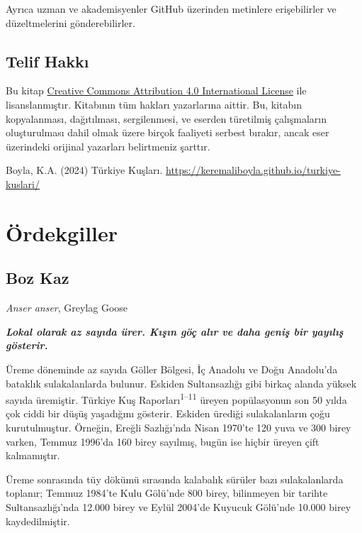 \documentclass[
  letterpaper,
  DIV=11,
  numbers=noendperiod]{scrreprt}
\begin{document}
Ayrıca uzman ve akademisyenler GitHub üzerinden metinlere erişebilirler
ve düzeltmelerini gönderebilirler.

\section*{Telif Hakkı}\label{telif-hakkux131}


Bu kitap \href{https://creativecommons.org/licenses/by/4.0/}{Creative
Commons Attribution 4.0 International License} ile lisanslanmıştır.
Kitabının tüm hakları yazarlarına aittir. Bu, kitabın kopyalanması,
dağıtılması, sergilenmesi, ve eserden türetilmiş çalışmaların
oluşturulması dahil olmak üzere birçok faaliyeti serbest bırakır, ancak
eser üzerindeki orijinal yazarları belirtmeniz şarttır.

Boyla, K.A. (2024) Türkiye Kuşları.
\url{https://keremaliboyla.github.io/turkiye-kuslari/}


\chapter{Ördekgiller}\label{uxf6rdekgiller}

\section{Boz Kaz}\label{boz-kaz}

\emph{Anser anser}, Greylag Goose

\textbf{\emph{Lokal olarak az sayıda ürer. Kışın göç alır ve daha geniş
bir yayılış gösterir.}}

Üreme döneminde az sayıda Göller Bölgesi, İç Anadolu ve Doğu Anadolu'da
bataklık sulakalanlarda bulunur. Eskiden Sultansazlığı gibi birkaç
alanda yüksek sayıda üremiştir. Türkiye Kuş
Raporları\textsuperscript{1--11} üreyen popülasyonun son 50 yılda çok
ciddi bir düşüş yaşadığını gösterir. Eskiden ürediği sulakalanların çoğu
kurutulmuştur. Örneğin, Ereğli Sazlığı'nda Nisan 1970'te 120 yuva ve 300
birey varken, Temmuz 1996'da 160 birey sayılmış, bugün ise hiçbir üreyen
çift kalmamıştır.

Üreme sonrasında tüy dökümü sırasında kalabalık sürüler bazı
sulakalanlarda toplanır; Temmuz 1984'te Kulu Gölü'nde 800 birey,
bilinmeyen bir tarihte Sultansazlığı'nda 12.000 birey ve Eylül 2004'de
Kuyucuk Gölü'nde 10.000 birey kaydedilmiştir.
\end{document}
